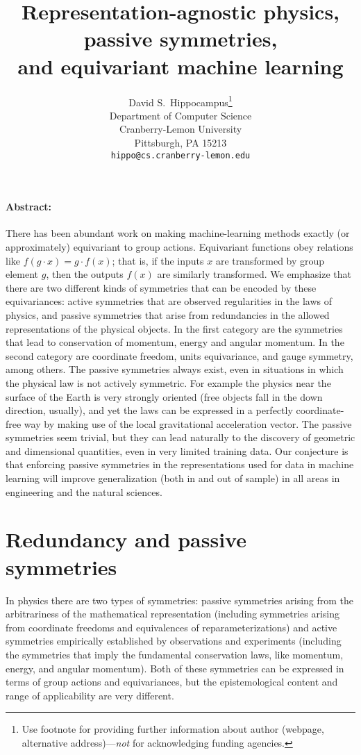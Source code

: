 \documentclass{article}
\title{Representation-agnostic physics, passive symmetries,\\ and equivariant machine learning}
\author{%
  David S.~Hippocampus\thanks{Use footnote for providing further information
    about author (webpage, alternative address)---\emph{not} for acknowledging
    funding agencies.} \\
  Department of Computer Science\\
  Cranberry-Lemon University\\
  Pittsburgh, PA 15213 \\
  \texttt{hippo@cs.cranberry-lemon.edu} \\
}
\begin{document}
\maketitle

\paragraph{Abstract:} 
There has been abundant work on making machine-learning methods exactly (or approximately) equivariant to group actions.
Equivariant functions obey relations like $f(g\cdot x) = g\cdot f(x)$; that is, if the inputs $x$ are transformed by group element $g$, then the outputs $f(x)$ are similarly transformed.
We emphasize that there are two different kinds of symmetries that can be encoded by these equivariances: active symmetries that are observed regularities in the laws of physics, and passive symmetries that arise from redundancies in the allowed representations of the physical objects. 
In the first category are the symmetries that lead to conservation of momentum, energy and angular momentum. In the second category are coordinate freedom, units equivariance, and gauge symmetry, among others.  
The passive symmetries always exist, even in situations in which the physical law is not actively symmetric.
For example the physics near the surface of the Earth is very strongly oriented (free objects fall in the down direction, usually), and yet the laws can be expressed in a perfectly coordinate-free way by making use of the local gravitational acceleration vector.
The passive symmetries seem trivial, but they can lead naturally to the discovery of geometric and dimensional quantities, even in very limited training data.
Our conjecture is that enforcing passive symmetries in the representations used for data in machine learning will improve generalization (both in and out of sample) in all areas in engineering and the natural sciences.

\section{Redundancy and passive symmetries}

In physics there are two types of symmetries: passive symmetries arising from the arbitrariness of the mathematical representation (including symmetries arising from coordinate freedoms and equivalences of reparameterizations) and active symmetries empirically established by observations and experiments (including the symmetries that imply the fundamental conservation laws, like momentum, energy, and angular momentum). Both of these symmetries can be expressed in terms of group actions and equivariances, but the epistemological content and range of applicability are very different. 
\end{document}
